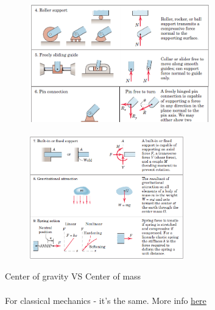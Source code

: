 \documentclass[aspectratio=169]{beamer}
\begin{document}
    \begin{frame}[t]{}
    \framesubtitle{}
        \begin{figure}[H]
            \centering\includegraphics[width=0.7\textwidth,keepaspectratio]{image15.png}
            \label{fig:image15}
        \end{figure}
    \end{frame}
    
    \begin{frame}[t]{}
    \framesubtitle{}
        \begin{figure}[H]
            \centering\includegraphics[width=0.6\textwidth,keepaspectratio]{image1.png}
            \label{fig:image1}
        \end{figure}
    \end{frame}
    
    \begin{frame}[t]{Center of gravity VS Center of mass}
    \framesubtitle{}
    For classical mechanics - it’s the same. More info \href{https://www.youtube.com/watch?v=abUFbZfPzjY}{here}
    
    \end{frame}
    
\end{document}
